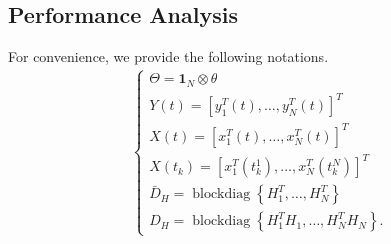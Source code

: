 \documentclass[10pt,journal,final]{IEEEtran}
\DeclareMathOperator{\blockdiag}{blockdiag}
\theoremstyle{plain}
\theoremstyle{definition}
\theoremstyle{remark}
\begin{document}
%

\subsection{Performance Analysis}
For convenience, we provide the following  notations.
\begin{align}\label{eq_denotations}
\begin{cases}
\Theta=\textbf{1}_N\otimes \theta\\
Y(t)=\left[y_1^T(t),\dots,y_N^T(t)\right]^T\\
X(t)=\left[x_1^T(t),\dots,x_N^T(t)\right]^T\\
X(t_k)=\left[x_{1}^T(t_{k}^1),\dots,x_{N}^T(t_{k}^N)\right]^T\\
\bar D_H=\blockdiag\left\{H_1^T,\dots,H_N^T\right\}\\
 D_H=\blockdiag\left\{H_1^TH_1,\dots,H_N^TH_N\right\}.
\end{cases}
\end{align}
	


%
%
\end{document}
